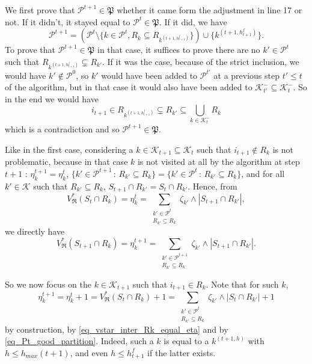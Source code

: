 \documentclass[
  11pt,
  a4paper,
]{article}
\theoremstyle{plain}
\theoremstyle{plain}
\theoremstyle{plain}
\theoremstyle{definition}
\theoremstyle{definition}
\theoremstyle{remark}
\begin{document}
We first prove that \(\mathcal{P}^{t+1}\in\mathfrak P\) whether it came
form the adjustment in line 17 or not. If it didn't, it stayed equal to
\(\mathcal{P}^t\in\mathfrak P\). If it did, we have
\begin{equation}\label{eq_rel_rec_p}
\mathcal{P}^{t+1}=\left(\mathcal{P}^t \setminus\{k\in\mathcal{P}^t, R_k\subseteq R_{  k^{(t+1,h^f_{t+1})}   }   \}  \right)\cup \{ k^{(t+1,h^f_{t+1})} \}.
\end{equation} To prove that \(\mathcal{P}^{t+1}\in\mathfrak P\) in that
case, it suffices to prove there are no \(k'\in\mathcal{P}^t\) such that
\(R_{  k^{(t+1,h^f_{t+1})}} \subsetneq  R_{k'}\). If it was the case,
because of the strict inclusion, we would have
\(k'\not\in\mathcal{P}^0\), so \(k'\) would have been added to
\(\mathcal{P}^{t'}\) at a previous step \(t'\leq t\) of the algorithm,
but in that case it would also have been added to
\(\mathcal{K}_{t'}^-\subseteq \mathcal{K}_{t}^-\). So in the end we
would have \begin{equation*}
i_{t+1}\in R_{  k^{(t+1,h^f_{t+1})}} \subsetneq R_{k'} \subseteq \bigcup_{k\in\mathcal{K}^-_{t}}R_k
\end{equation*} which is a contradiction and so
\(\mathcal{P}^{t+1}\in\mathfrak P\).

Like in the first case, considering a
\(k\in\mathcal{K}_{t+1}\subseteq \mathcal{K}_t\) such that
\(i_{t+1}\not\in R_k\) is not problematic, because in that case \(k\) is
not visited at all by the algorithm at step \(t+1\) :
\(\eta^{t+1}_k=\eta^{t}_k\),
\(\{k'\in\mathcal{P}^{t+1}\,:\,R_{k'}\subseteq R_k\}=\{k'\in\mathcal{P}^{t}\,:\,R_{k'}\subseteq R_k\}\),
and for all \(k'\in \mathcal{K}\) such that \(R_{k'}\subseteq R_k\),
\(S_{t+1}\cap R_{k'}=S_{t}\cap R_{k'}\). Hence, from \begin{equation*}
V^*_{\mathfrak{R}}(S_{t}\cap R_k) =  \eta_k^{t} =  \sum_{\substack{k'\in\mathcal{P}^{t}\\R_{k'}\subseteq R_k}} \zeta_{k'}\wedge |S_{t+1}\cap R_{k'}| ,
\end{equation*} we directly have \begin{equation*}
V^*_{\mathfrak{R}}(S_{t+1}\cap R_k) =  \eta_k^{t+1} =  \sum_{\substack{k'\in\mathcal{P}^{t+1}\\R_{k'}\subseteq R_k}} \zeta_{k'}\wedge |S_{t+1}\cap R_{k'}| .
\end{equation*}

So we now focus on the \(k\in\mathcal{K}_{t+1}\) such that
\(i_{t+1}\in R_k\). Note that for such \(k\), \begin{equation*}
\eta^{t+1}_k=\eta^t_k+1=V^*_{\mathfrak{R}}(S_t\cap R_k)+1=\sum_{\substack{k'\in \mathcal{P}^t\\ R_{k'}\subseteq R_k}}\zeta_{k'}\wedge|S_t\cap R_{k'}|+1
\end{equation*} by construction, by \eqref{eq_vstar_inter_Rk_equal_eta}
and by \eqref{eq_Pt_good_partition}. Indeed, such a \(k\) is equal to a
\(k^{(t+1,h)}\) with \(h\leq h_{max}(t+1)\), and even
\(h\leq h^f_{t+1}\) if the latter exists.
\end{document}
